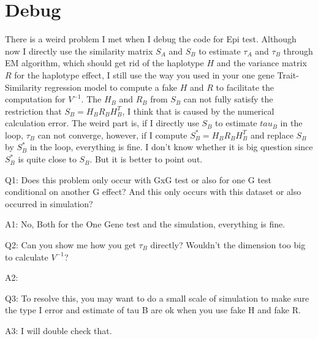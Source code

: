 \documentclass{article}
\begin{document}
    \section{Debug}
        There is a weird problem I met when I debug the code for Epi test. Although now I directly use the similarity matrix $S_A$ and $S_B$ to estimate $\tau_A$ and $\tau_B$ through EM algorithm, which should get rid of the haplotype $H$ and the variance matrix $R$ for the haplotype effect, I still use the way you used in your one gene Trait-Similarity regression model to compute a fake $H$ and $R$ to facilitate the computation for $V^{-1}$. The $H_B$ and $R_B$ from $S_B$ can not fully satisfy the restriction that $S_B=H_BR_BH^T_B$, I think that is caused by the numerical calculation error. The weird part is, if I directly use $S_B$ to estimate $tau_B$ in the loop, $\tau_B$ can not converge, however, if I compute $S^*_B=H_BR_BH^T_B$ and replace $S_B$ by $S^*_B$ in the loop, everything is fine. I don't know whether it is big question since $S^*_B$ is quite close to $S_B$. But it is better to point out.        
        \begin{boxedminipage}{\textwidth}
        Q1: Does this problem only occur with GxG test or also for one G test conditional on another G effect? And this only occurs with this dataset or also occurred in simulation?

        A1: No, Both for the One Gene test and the simulation, everything is fine.
            
        Q2: Can you show me how you get $\tau_B$ directly? Wouldn't the dimension too big to calculate $V^{-1}$?
        
        A2: 
        
        Q3: To resolve this, you may want to do a small scale of simulation to make sure the type I error and estimate of tau B are ok when you use fake H and fake R. 
        
        A3: I will double check that.

        \end{boxedminipage}
\end{document}
